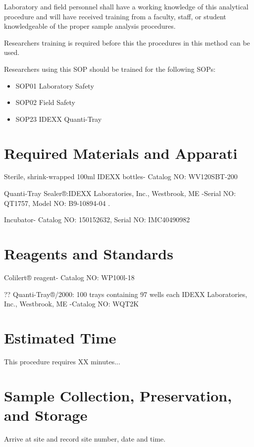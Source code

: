 \documentclass[12pt]{../SOP4_alpha}\usepackage[]{graphicx}\usepackage[]{xcolor}
\begin{document}
\NP Laboratory and field personnel shall have a working knowledge of this analytical procedure and will have received training from a faculty, staff, or student knowledgeable of the proper sample analysis procedures. 

\NP Researchers training is required before this the procedures in this method can be used.

\NP Researchers using this SOP should be trained for the following SOPs:

\begin{itemize}
  \item SOP01 Laboratory Safety
  \item SOP02 Field Safety
  \item SOP23 IDEXX Quanti-Tray
\end{itemize}

\section{Required Materials and Apparati}

 Sterile, shrink-wrapped 100ml IDEXX bottles- Catalog NO: WV120SBT-200


\NP Quanti-Tray Sealer®:IDEXX Laboratories, Inc., Westbrook, ME -Serial NO: QT1757, Model NO: B9-10894-04
.

\NP Incubator- Catalog NO: 150152632, Serial NO: IMC40490982


\section{Reagents and Standards}

\NP Colilert® reagent- Catalog NO: WP100l-18

\NP ?? Quanti-Tray®/2000: 100 trays containing 97 wells each IDEXX Laboratories, Inc., Westbrook, ME -Catalog NO: WQT2K

\section{Estimated Time}

\NP This procedure requires XX minutes...

\section{Sample Collection, Preservation, and Storage}

\NP  Arrive at site and record site number, date and time.
\end{document}
